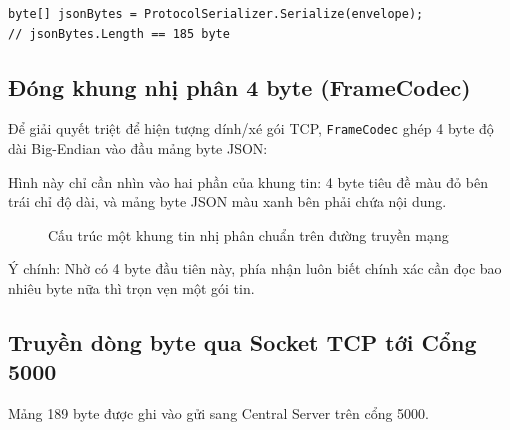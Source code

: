 \documentclass[12pt,a4paper]{article}
\begin{document}
\begin{lstlisting}[language=CSharp]
byte[] jsonBytes = ProtocolSerializer.Serialize(envelope);
// jsonBytes.Length == 185 byte
\end{lstlisting}

\subsection{Đóng khung nhị phân 4 byte (FrameCodec)}
Để giải quyết triệt để hiện tượng dính/xé gói TCP, \texttt{FrameCodec} ghép 4 byte độ dài Big-Endian vào đầu mảng byte JSON:

Hình này chỉ cần nhìn vào hai phần của khung tin: 4 byte tiêu đề màu đỏ bên trái chỉ độ dài, và mảng byte JSON màu xanh bên phải chứa nội dung.

\begin{figure}[H]
  \centering
  \caption{Cấu trúc một khung tin nhị phân chuẩn trên đường truyền mạng}
  \label{fig:frame_binary_structure}
\end{figure}

Ý chính: Nhờ có 4 byte đầu tiên này, phía nhận luôn biết chính xác cần đọc bao nhiêu byte nữa thì trọn vẹn một gói tin.

\subsection{Truyền dòng byte qua Socket TCP tới Cổng 5000}
Mảng 189 byte được ghi vào  gửi sang Central Server trên cổng 5000.
\end{document}
